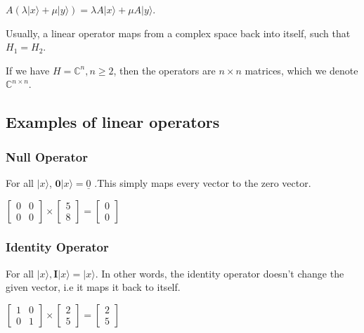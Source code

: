 \documentclass[12pt]{article}
\begin{document}
$A(\lambda \lvert x \rangle + \mu \lvert y \rangle) = \lambda A \lvert x \rangle + \mu A \lvert y \rangle$.

Usually, a linear operator maps from a complex space back into itself, such that $H_1 = H_2$.

If we have $H = \mathbb{C}^n, n \geq 2$, then the operators are $n \times n$ matrices, which we denote $\mathbb{C}^{n \times n}$.

\subsection{Examples of linear operators}

\subsubsection{Null Operator}

For all $\lvert x \rangle$, $\textbf{0} \lvert x \rangle = \underline{0}$
.This simply maps every vector to the zero vector.

$\begin{bmatrix} 0 & 0 \\ 0 & 0 \end{bmatrix} \times \begin{bmatrix} 5 \\ 8 \end{bmatrix} = \begin{bmatrix} 0 \\ 0 \end{bmatrix}$

\subsubsection{Identity Operator}

For all $\lvert x \rangle, \textbf{I}\lvert x \rangle = \lvert x \rangle$. In other words, the identity operator doesn't change the given vector, i.e it maps it back to itself.

$\begin{bmatrix} 1 & 0 \\ 0 & 1 \end{bmatrix} \times \begin{bmatrix} 2 \\ 5 \end{bmatrix} = \begin{bmatrix} 2 \\ 5 \end{bmatrix}$
\end{document}
